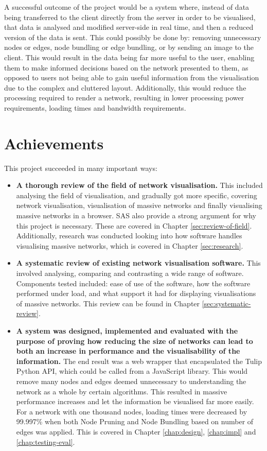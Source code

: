 \documentclass[../dissertation.tex]{subfiles}
\begin{document}
A successful outcome of the project would be a system where, instead of data being transferred to the client directly from the server in order to be visualised, that data is analysed and modified server-side in real time, and then a reduced version of the data is sent. This could possibly be done by: removing unnecessary nodes or edges, node bundling or edge bundling, or by sending an image to the client. This would result in the data being far more useful to the user, enabling them to make informed decisions based on the network presented to them, as opposed to users not being able to gain useful information from the visualisation due to the complex and cluttered layout. Additionally, this would reduce the processing required to render a network, resulting in lower processing power requirements, loading times and bandwidth requirements.

\section{Achievements}

This project succeeded in many important ways:

\begin{itemize}
    \item \textbf{A thorough review of the field of network visualisation.} This included analysing the field of visualisation, and gradually got more specific, covering network visualisation, visualisation of massive networks and finally visualising massive networks in a browser. SAS also provide a strong argument for why this project is necessary. These are covered in Chapter \ref{sec:review-of-field}. Additionally, research was conducted looking into how software handles visualising massive networks, which is covered in Chapter \ref{sec:research}.
    \item \textbf{A systematic review of existing network visualisation software.} This involved analysing, comparing and contrasting a wide range of software. Components tested included: ease of use of the software, how the software performed under load, and what support it had for displaying visualisations of massive networks. This review can be found in Chapter \ref{sec:systematic-review}.
    \item \textbf{A system was designed, implemented and evaluated with the purpose of proving how reducing the size of networks can lead to both an increase in performance and the visualisability of the information.} The end result was a web wrapper that encapsulated the Tulip Python API, which could be called from a JavaScript library. This would remove many nodes and edges deemed unnecessary to understanding the network as a whole by certain algorithms. This resulted in massive performance increases and let the information be visualised far more easily. For a network with one thousand nodes, loading times were decreased by 99.997\% when both Node Pruning and Node Bundling based on number of edges was applied. This is covered in Chapter \ref{chap:design}, \ref{chap:impl} and \ref{chap:testing-eval}.
\end{itemize}
\end{document}
